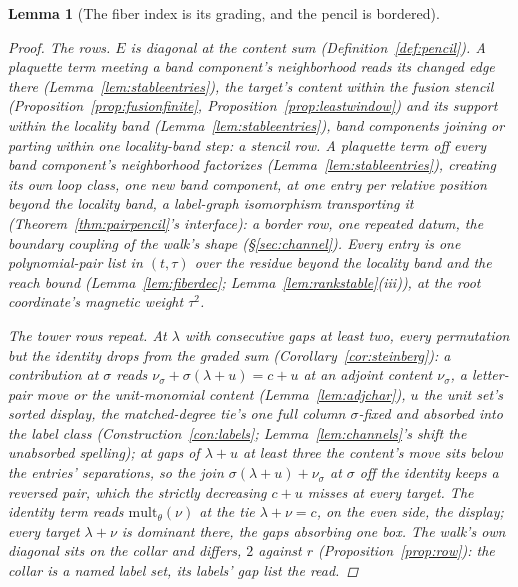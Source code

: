 \documentclass[11pt]{article}
\newtheorem{lemma}{Lemma}
\theoremstyle{definition}
\begin{document}
\begin{lemma}[The fiber index is its grading, and the pencil is
bordered]
\begin{proof}
\emph{The rows.} $E$ is diagonal at the content sum
(Definition~\ref{def:pencil}). A plaquette term meeting a band
component's neighborhood reads its changed edge there
(Lemma~\ref{lem:stableentries}), the target's content within the
fusion stencil (Proposition~\ref{prop:fusionfinite},
Proposition~\ref{prop:leastwindow}) and its support within the locality band
(Lemma~\ref{lem:stableentries}), band components joining or parting within
one locality-band step: a \emph{stencil row}. A plaquette term off every band
component's neighborhood factorizes (Lemma~\ref{lem:stableentries}),
creating its own loop class, one new band component, at one entry per
relative position beyond the locality band, a label-graph isomorphism
transporting it (Theorem~\ref{thm:pairpencil}'s interface): a
\emph{border row}, one repeated datum, the boundary coupling of
the walk's shape (\S\ref{sec:channel}). Every entry is one
polynomial-pair list in $(t,\tau)$ over the residue beyond the locality band
and the reach bound
(Lemma~\ref{lem:fiberdec}; Lemma~\ref{lem:rankstable}(iii)), at the
root coordinate's magnetic weight $\tau^2$.

\emph{The tower rows repeat.} At $\lambda$ with consecutive gaps at
least two, every permutation but the identity drops from the graded
sum (Corollary~\ref{cor:steinberg}): a contribution at $\sigma$ reads
$\nu_\sigma+\sigma(\lambda+u)=c+u$ at an adjoint content
$\nu_\sigma$, a
letter-pair move or the unit-monomial content
(Lemma~\ref{lem:adjchar}), $u$ the unit set's sorted display, the
matched-degree tie's one full column $\sigma$-fixed and absorbed
into the label class (Construction~\ref{con:labels};
Lemma~\ref{lem:channels}'s shift the unabsorbed spelling); at
gaps of
$\lambda+u$ at least three the content's move sits below the
entries' separations, so the join
$\sigma(\lambda+u)+\nu_\sigma$ at $\sigma$ off the identity keeps
a reversed pair, which the strictly decreasing $c+u$ misses at
every target. The
identity term reads
$\mathrm{mult}_\theta(\nu)$ at the tie $\lambda+\nu=c$, on the even
side, the display; every
target $\lambda+\nu$ is dominant there, the gaps absorbing one box.
The walk's own diagonal sits on the collar and differs, $2$ against
$r$ (Proposition~\ref{prop:row}): the collar is a named label set, its
labels' gap list the read.


\end{proof}
\end{lemma}
\end{document}
